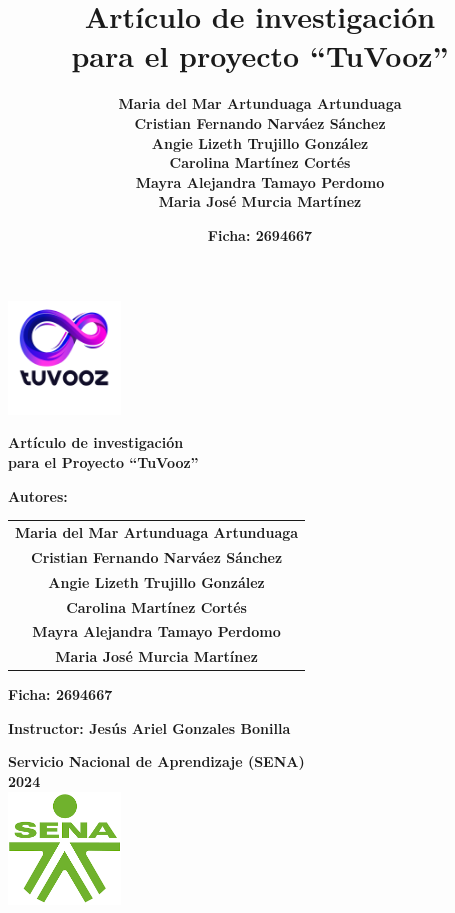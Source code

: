 \documentclass[12pt, a4paper, twocolumn]{article}
\title{\Huge\textbf{Artículo de investigación\\ para el proyecto “TuVooz”}}
\author{
    \textbf{Maria del Mar Artunduaga Artunduaga} \\
    \textbf{Cristian Fernando Narváez Sánchez} \\
    \textbf{Angie Lizeth Trujillo González} \\
    \textbf{Carolina Martínez Cortés} \\
    \textbf{Mayra Alejandra Tamayo Perdomo} \\
    \textbf{Maria José Murcia Martínez}
}
\date{\textbf{Ficha: 2694667}}
\begin{document}
\begin{titlingpage}
    \centering
    \vspace*{0.5cm}
    \includegraphics[width=3cm]{logo.png} 
    \vspace{0.5cm}
    
    {\Huge\textbf{Artículo de investigación\\ para el Proyecto “TuVooz”}}
    \vspace{1.5cm}
    
    \textbf{\large Autores:}
    \vspace{0.5cm}
    
    \begin{tabular}{c}
        \textbf{Maria del Mar Artunduaga Artunduaga} \\
        \textbf{Cristian Fernando Narváez Sánchez} \\
        \textbf{Angie Lizeth Trujillo González} \\
        \textbf{Carolina Martínez Cortés} \\
        \textbf{Mayra Alejandra Tamayo Perdomo} \\
        \textbf{Maria José Murcia Martínez}
    \end{tabular}
    \vspace{1cm}
    
    \textbf{\large Ficha: 2694667}
    \vspace{1cm}
    
    \textbf{\large Instructor: Jesús Ariel Gonzales Bonilla}
    \vspace{2cm}
    
    \textbf{Servicio Nacional de Aprendizaje (SENA)} \\
    \textbf{2024}\\
     \centering
    \vspace*{3cm}
     \includegraphics[width=3cm]{logoSena.png} 
    
\end{titlingpage}
\end{document}
